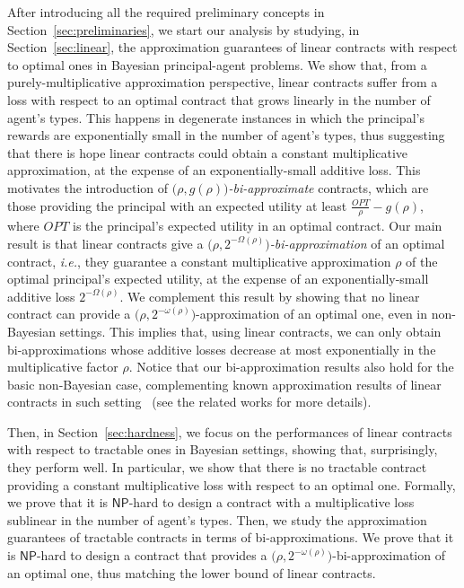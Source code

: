 After introducing all the required preliminary concepts in Section~\ref{sec:preliminaries}, we start our analysis by studying, in Section~\ref{sec:linear}, the approximation guarantees of linear contracts with respect to optimal ones in Bayesian principal-agent problems.
%
We show that, from a purely-multiplicative approximation perspective, linear contracts suffer from a loss with respect to an optimal contract that grows linearly in the number of agent's types.
%
This happens in degenerate instances in which the principal's rewards are exponentially small in the number of agent's types, thus suggesting that there is hope linear contracts could obtain a constant multiplicative approximation, at the expense of an exponentially-small additive loss.
%
This motivates the introduction of $\big( \rho, g(\rho) \big)$\emph{-bi-approximate} contracts, which are those providing the principal with an expected utility at least $\frac{OPT}{\rho} - g(\rho)$, where $OPT$ is the principal's expected utility in an optimal contract.
%
Our main result is that linear contracts give a $\big( \rho, 2^{-\Omega(\rho)}\big)$\emph{-bi-approximation} of an optimal contract, \emph{i.e.}, they guarantee a constant multiplicative approximation $\rho$ of the optimal principal's expected utility, at the expense of an exponentially-small additive loss $2^{-\Omega(\rho)}$.
%
We complement this result by showing that no linear contract can provide a $\big(  \rho ,2^{-\omega \left( \rho \right)} \big)$-approximation of an optimal one, even in non-Bayesian settings.
%
This implies that, using linear contracts, we can only obtain bi-approximations whose additive losses decrease at most exponentially in the multiplicative factor $\rho$.
%
Notice that our bi-approximation results also hold for the basic non-Bayesian case, complementing known approximation results of linear contracts in such setting~\citep{dutting2019simple} (see the related works for more details).


Then, in Section~\ref{sec:hardness}, we focus on the performances of linear contracts with respect to tractable ones in Bayesian settings, showing that, surprisingly, they perform well.
%
In particular, we show that there is no tractable contract providing a constant multiplicative loss with respect to an optimal one.
%
Formally, we prove that it is $\mathsf{NP}$-hard to design a contract with a multiplicative loss sublinear in the number of agent's types.
%
Then, we study the approximation guarantees of tractable contracts in terms of bi-approximations.
%
We prove that it is $\mathsf{NP}$-hard to design a contract that provides a $\big( \rho,2^{-\omega(\rho)} \big)$-bi-approximation of an optimal one, thus matching the lower bound of linear contracts.



